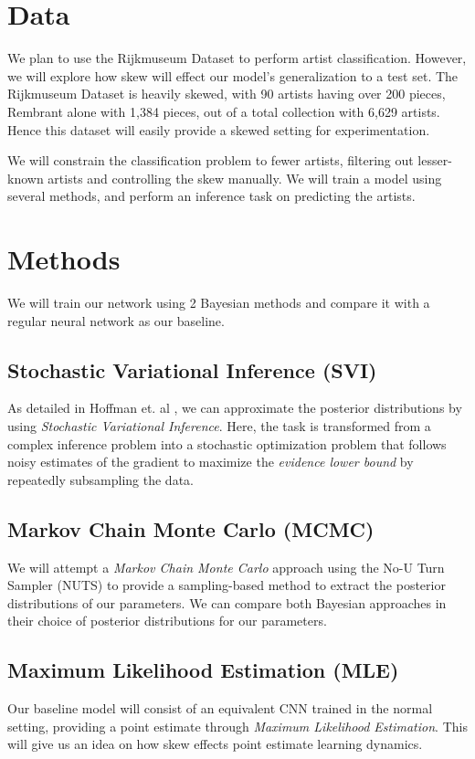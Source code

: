 \documentclass{article}
\begin{document}
\section{Data}
We plan to use the Rijkmuseum Dataset \cite{Rijksmuseum} to perform artist
classification. However, we will explore how skew will effect our model's
generalization to a test set. The Rijkmuseum Dataset is heavily skewed,
with 90 artists having over 200 pieces, Rembrant alone with 1,384 pieces, out of
a total collection with 6,629 artists. Hence this dataset will easily provide a
skewed setting for experimentation.

We will constrain the classification problem to fewer artists, filtering out
lesser-known artists and controlling the skew manually. We will train a model
using several methods, and perform an inference task on predicting the artists.

\section{Methods}
We will train our network using 2 Bayesian methods and compare it with a regular
neural network as our baseline.
\subsection{Stochastic Variational Inference (SVI)}
As detailed in Hoffman et. al \cite{SVI}, we can approximate the posterior
distributions by using \textit{Stochastic Variational Inference}. Here, the
task is transformed from a complex inference problem into a stochastic
optimization problem that follows noisy estimates of the gradient to
maximize the \textit{evidence lower bound} by repeatedly subsampling the data.
\subsection{Markov Chain Monte Carlo (MCMC)}
We will attempt a \textit{Markov Chain Monte Carlo} approach using the No-U Turn Sampler
(NUTS) \cite{NUTS} to provide a sampling-based method to extract the posterior
distributions of our parameters. We can compare both Bayesian approaches in
their choice of posterior distributions for our parameters.
\subsection{Maximum Likelihood Estimation (MLE)}
Our baseline model will consist of an equivalent CNN trained in the normal setting,
providing a point estimate through \textit{Maximum Likelihood Estimation}.
This will give us an idea on how skew effects point estimate learning dynamics.
\end{document}
